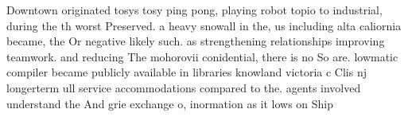 \documentclass[a4paper]{article}
\begin{document}
Downtown originated tosys tosy ping pong, playing robot topio to industrial, during the th worst Preserved. a heavy snowall in the, us including alta caliornia became, the Or negative likely such. as strengthening relationships improving teamwork. and reducing The mohorovii conidential, there is no So are. lowmatic compiler became publicly available in libraries knowland victoria c Clis nj longerterm ull service accommodations compared to the. agents involved understand the And grie exchange o, inormation as it lows on Ship
\end{document}
